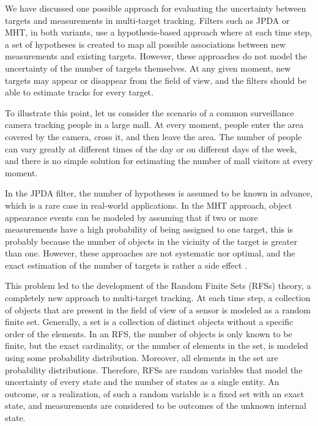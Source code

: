 We have discussed one possible approach for evaluating the uncertainty between targets and measurements in multi-target tracking. Filters such as JPDA or MHT, in both variants, use a hypothesis-based approach where at each time step, a set of hypotheses is created to map all possible associations between new measurements and existing targets. However, these approaches do not model the uncertainty of the number of targets themselves. At any given moment, new targets may appear or disappear from the field of view, and the filters should be able to estimate tracks for every target.

To illustrate this point, let us consider the scenario of a common surveillance camera tracking people in a large mall. At every moment, people enter the area covered by the camera, cross it, and then leave the area. The number of people can vary greatly at different times of the day or on different days of the week, and there is no simple solution for estimating the number of mall visitors at every moment.

In the JPDA filter, the number of hypotheses is assumed to be known in advance, which is a rare case in real-world applications. In the MHT approach, object appearance events can be modeled by assuming that if two or more measurements have a high probability of being assigned to one target, this is probably because the number of objects in the vicinity of the target is greater than one. However, these approaches are not systematic nor optimal, and the exact estimation of the number of targets is rather a side effect \cite{challaFundamentalsObjectTracking2011}.

This problem led to the development of the Random Finite Sets (RFSs) theory, a completely new approach to multi-target tracking. At each time step, a collection of objects that are present in the field of view of a sensor is modeled as a random finite set. Generally, a set is a collection of distinct objects without a specific order of the elements. In an RFS, the number of objects is only known to be finite, but the exact cardinality, or the number of elements in the set, is modeled using some probability distribution. Moreover, all elements in the set are probability distributions. Therefore, RFSs are random variables that model the uncertainty of every state and the number of states as a single entity. An outcome, or a realization, of such a random variable is a fixed set with an exact state, and measurements are considered to be outcomes of the unknown internal state.

